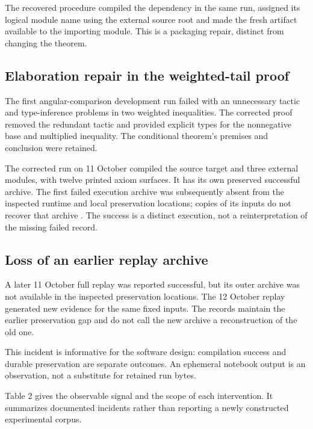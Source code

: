 \documentclass[11pt,a4paper]{article}
\begin{document}
The recovered procedure compiled the dependency in the same run, assigned its logical module name using the external source root and made the fresh artifact available to the importing module. This is a packaging repair, distinct from changing the theorem.

\subsection{Elaboration repair in the weighted-tail proof}

The first angular-comparison development run failed with an unnecessary tactic and type-inference problems in two weighted inequalities. The corrected proof removed the redundant tactic and provided explicit types for the nonnegative base and multiplied inequality. The conditional theorem's premises and conclusion were retained.

The corrected run on 11 October compiled the source target and three external modules, with twelve printed axiom surfaces. It has its own preserved successful archive. The first failed execution archive was subsequently absent from the inspected runtime and local preservation locations; copies of its inputs do not recover that archive \cite{ref9}. The success is a distinct execution, not a reinterpretation of the missing failed record.

\subsection{Loss of an earlier replay archive}

A later 11 October full replay was reported successful, but its outer archive was not available in the inspected preservation locations. The 12 October replay generated new evidence for the same fixed inputs. The records maintain the earlier preservation gap and do not call the new archive a reconstruction of the old one.

This incident is informative for the software design: compilation success and durable preservation are separate outcomes. An ephemeral notebook output is an observation, not a substitute for retained run bytes.

Table 2 gives the observable signal and the scope of each intervention. It summarizes documented incidents rather than reporting a newly constructed experimental corpus.
\end{document}
